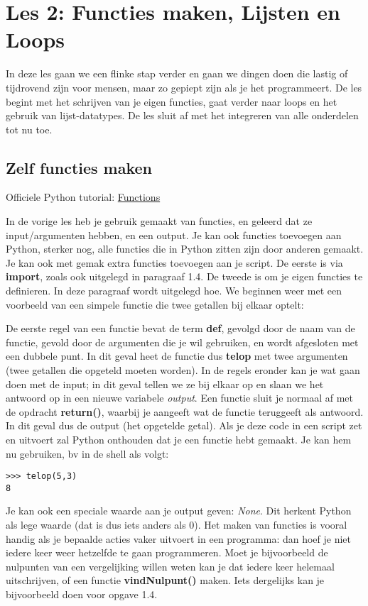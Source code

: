 \chapter{Les 2: Functies maken, Lijsten en Loops}
In deze les gaan we een flinke stap verder en gaan we dingen doen die lastig of tijdrovend zijn voor mensen, maar zo gepiept zijn als je het programmeert. De les begint met het schrijven van je eigen functies, gaat verder naar loops en het gebruik van lijst-datatypes. De les sluit af met het integreren van alle onderdelen tot nu toe.

\section{Zelf functies maken}
Officiele Python tutorial: \href{https://docs.python.org/3/tutorial/controlflow.html\#defining-functions}{Functions}

In de vorige les heb je gebruik gemaakt van functies, en geleerd dat ze input/argumenten hebben, en een output. Je kan ook functies toevoegen aan Python, sterker nog, alle functies die in Python zitten zijn door anderen gemaakt. Je kan ook met gemak extra functies toevoegen aan je script. De eerste is via \textbf{import}, zoals ook uitgelegd in paragraaf 1.4. De tweede is om je eigen functies te definieren. In deze paragraaf wordt uitgelegd hoe. We beginnen weer met een voorbeeld van een simpele functie die twee getallen bij elkaar optelt:



De eerste regel van een functie bevat de term \textbf{def}, gevolgd door de naam van de functie, gevold door de argumenten die je wil gebruiken, en wordt afgesloten met een dubbele punt. In dit geval heet de functie dus \textbf{telop} met twee argumenten (twee getallen die opgeteld moeten worden).
In de regels eronder kan je wat gaan doen met de input; in dit geval tellen we ze bij elkaar op en slaan we het antwoord op in een nieuwe variabele \textit{output}. Een functie sluit je normaal af met de opdracht \textbf{return()}, waarbij je aangeeft wat de functie teruggeeft als antwoord. In dit geval dus de output (het opgetelde getal). Als je deze code in een script zet en uitvoert zal Python onthouden dat je een functie hebt gemaakt. Je kan hem nu gebruiken, bv in de shell als volgt:

\begin{lstlisting}[frame=single]
>>> telop(5,3)
8
\end{lstlisting}
Je kan ook een speciale waarde aan je output geven: \textit{None}. Dit herkent Python als lege waarde (dat is dus iets anders als 0). 
Het maken van functies is vooral handig als je bepaalde acties vaker uitvoert in een programma: dan hoef je niet iedere keer weer hetzelfde te gaan programmeren. Moet je bijvoorbeeld de nulpunten van een vergelijking willen weten kan je dat iedere keer helemaal uitschrijven, of een functie \textbf{vindNulpunt()} maken. Iets dergelijks kan je bijvoorbeeld doen voor opgave 1.4.

